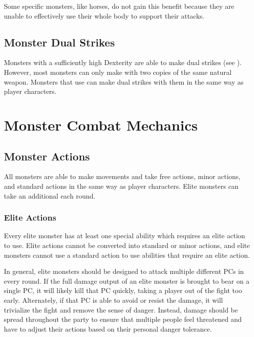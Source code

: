     Some specific monsters, like horses, do not gain this benefit because they are unable to effectively use their whole body to support their attacks.

  \subsection{Monster Dual Strikes}\label{Monster Dual Strikes}
    Monsters with a sufficiently high Dexterity are able to make dual strikes (see ).
    However, most monsters can only make  with two copies of the same  natural weapon.
    Monsters that use  can make dual strikes with them in the same way as player characters.

\section{Monster Combat Mechanics}

  \subsection{Monster Actions}\label{Monster Actions}
    All monsters are able to make movements and take free actions, minor actions, and standard actions in the same way as player characters.
    Elite monsters can take an additional  each round.

    \subsubsection{Elite Actions}\label{Elite Actions}
      Every elite monster has at least one special ability which requires an elite action to use.
      Elite actions cannot be converted into standard or minor actions, and elite monsters cannot use a standard action to use abilities that require an elite action.

      In general, elite monsters should be designed to attack multiple different PCs in every round.
      If the full damage output of an elite monster is brought to bear on a single PC, it will likely kill that PC quickly, taking a player out of the fight too early.
      Alternately, if that PC is able to avoid or resist the damage, it will trivialize the fight and remove the sense of danger.
      Instead, damage should be spread throughout the party to ensure that multiple people feel threatened and have to adjust their actions based on their personal danger tolerance.

